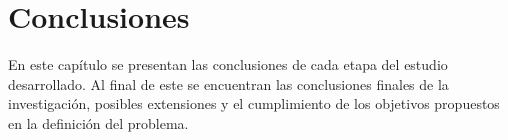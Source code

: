 \chapter*{Conclusiones}

En este capítulo se presentan las conclusiones de cada etapa del estudio desarrollado. Al final de este se encuentran las conclusiones finales de la investigación, posibles extensiones y el cumplimiento de los objetivos propuestos en la definición del problema.